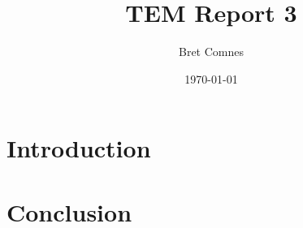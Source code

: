 \documentclass[12pt,a4paper]{article}
\title{TEM Report 3}
\author{Bret Comnes}
\date{\today}
\begin{document}
\maketitle

\section{Introduction} %




\section{Conclusion} %



 
 \nocite{*}
\end{document}
